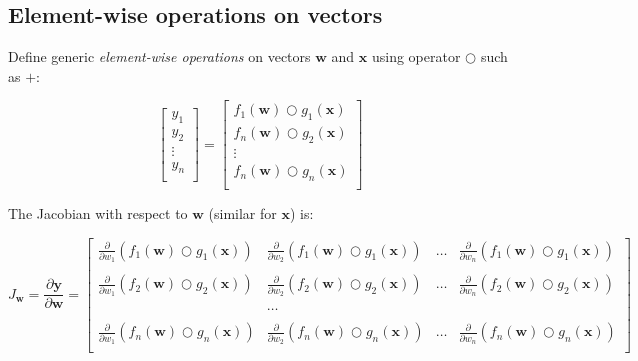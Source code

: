 \documentclass[11pt]{article}
\begin{document}
\subsection{Element-wise operations on vectors}		 

Define generic {\em element-wise operations} on vectors $\mathbf{w}$ and $\mathbf{x}$ using operator $\bigcirc$ such as $+$:

\[
\begin{bmatrix}
           y_1\\
           y_2\\
           \vdots \\
           y_n\\
           \end{bmatrix} = \begin{bmatrix}
           f_{1}(\mathbf{w}) \bigcirc g_{1}(\mathbf{x})\\
           f_{n}(\mathbf{w}) \bigcirc g_{2}(\mathbf{x})\\
           \vdots \\
           f_{n}(\mathbf{w}) \bigcirc g_{n}(\mathbf{x})\\
         \end{bmatrix}\]

The Jacobian with respect to $\mathbf{w}$ (similar for $\mathbf{x}$) is:

\[
J_{\mathbf{w}} = \frac{\partial \mathbf{y}}{\partial \mathbf{w}}  = \begin{bmatrix}
\frac{\partial}{\partial w_1} ( f_{1}(\mathbf{w}) \bigcirc g_{1}(\mathbf{x}) ) & \frac{\partial}{\partial w_2} ( f_{1}(\mathbf{w}) \bigcirc g_{1}(\mathbf{x}) ) & \ldots & \frac{\partial}{\partial w_n} ( f_{1}(\mathbf{w}) \bigcirc g_{1}(\mathbf{x}) )\\\\
\frac{\partial}{\partial w_1} ( f_{2}(\mathbf{w}) \bigcirc g_{2}(\mathbf{x}) ) & \frac{\partial}{\partial w_2} ( f_{2}(\mathbf{w}) \bigcirc g_{2}(\mathbf{x}) ) & \ldots & \frac{\partial}{\partial w_n} ( f_{2}(\mathbf{w}) \bigcirc g_{2}(\mathbf{x}) )\\\\
& \ldots\\\\
\frac{\partial}{\partial w_1} ( f_{n}(\mathbf{w}) \bigcirc g_{n}(\mathbf{x}) ) & \frac{\partial}{\partial w_2} ( f_{n}(\mathbf{w}) \bigcirc g_{n}(\mathbf{x}) ) & \ldots & \frac{\partial}{\partial w_n} ( f_{n}(\mathbf{w}) \bigcirc g_{n}(\mathbf{x}) )\\
\end{bmatrix}
\]
\end{document}
